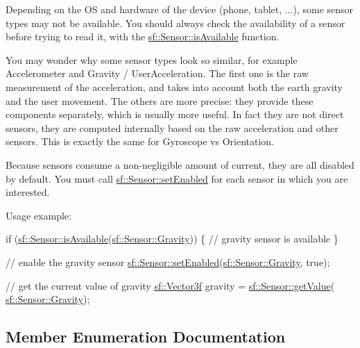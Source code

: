 Depending on the OS and hardware of the device (phone, tablet, ...), some sensor types may not be available. You should always check the availability of a sensor before trying to read it, with the \hyperlink{classsf_1_1_sensor_a7b7a2570218221781233bd495323abf0}{sf\+::\+Sensor\+::is\+Available} function.

You may wonder why some sensor types look so similar, for example Accelerometer and Gravity / User\+Acceleration. The first one is the raw measurement of the acceleration, and takes into account both the earth gravity and the user movement. The others are more precise\+: they provide these components separately, which is usually more useful. In fact they are not direct sensors, they are computed internally based on the raw acceleration and other sensors. This is exactly the same for Gyroscope vs Orientation.

Because sensors consume a non-\/negligible amount of current, they are all disabled by default. You must call \hyperlink{classsf_1_1_sensor_afb31c5697d2e0a5fec70d702ec1d6cd9}{sf\+::\+Sensor\+::set\+Enabled} for each sensor in which you are interested.

Usage example\+: 
\begin{DoxyCode}
\textcolor{keywordflow}{if} (\hyperlink{classsf_1_1_sensor_a7b7a2570218221781233bd495323abf0}{sf::Sensor::isAvailable}(\hyperlink{classsf_1_1_sensor_a687375af3ab77b818fca73735bcaea84afab4d098cc64e791a0c4a9ef6b32db92}{sf::Sensor::Gravity}))
\{
    \textcolor{comment}{// gravity sensor is available}
\}

\textcolor{comment}{// enable the gravity sensor}
\hyperlink{classsf_1_1_sensor_afb31c5697d2e0a5fec70d702ec1d6cd9}{sf::Sensor::setEnabled}(\hyperlink{classsf_1_1_sensor_a687375af3ab77b818fca73735bcaea84afab4d098cc64e791a0c4a9ef6b32db92}{sf::Sensor::Gravity}, \textcolor{keyword}{true});

\textcolor{comment}{// get the current value of gravity}
\hyperlink{classsf_1_1_vector3}{sf::Vector3f} gravity = \hyperlink{classsf_1_1_sensor_ab9a2710f55ead2f7b4e1b0bead34457e}{sf::Sensor::getValue}(
      \hyperlink{classsf_1_1_sensor_a687375af3ab77b818fca73735bcaea84afab4d098cc64e791a0c4a9ef6b32db92}{sf::Sensor::Gravity});
\end{DoxyCode}
 

\subsection{Member Enumeration Documentation}
\mbox{\label{classsf_1_1_sensor_a687375af3ab77b818fca73735bcaea84}} 
